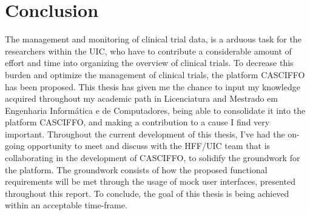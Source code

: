 \chapter{Conclusion}
The management and monitoring of clinical trial data, is a arduous task for the researchers within the UIC, who have to contribute a considerable amount of effort and time into organizing the overview of clinical trials. To decrease this burden and optimize the management of clinical trials, the platform CASCIFFO has been proposed. 
This thesis has given me the chance to input my knowledge acquired throughout my academic path in Licenciatura and Mestrado em Engenharia Informática e de Computadores, being able to consolidate it into the platform CASCIFFO, and making a contribution to a cause I find very important.
Throughout the current development of this thesis, I've had the on-going opportunity to meet and discuss with the HFF/UIC team that is collaborating in the development of CASCIFFO, to solidify the groundwork for the platform. The groundwork consists of how the proposed functional requirements will be met through the usage of mock user interfaces, presented throughout this report.
To conclude, the goal of this thesis is being achieved within an acceptable time-frame.

